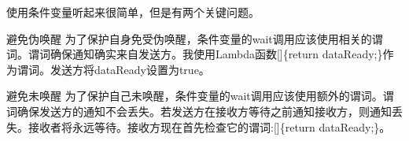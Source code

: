 
使用条件变量听起来很简单，但是有两个关键问题。

\begin{myWarning}{避免伪唤醒}
为了保护自身免受伪唤醒，条件变量的wait调用应该使用相关的谓词。谓词确保通知确实来自发送方。我使用Lambda函数[]\{return dataReady;\}作为谓词。发送方将dataReady设置为true。
\end{myWarning}

\begin{myWarning}{避免未唤醒}
为了保护自己未唤醒，条件变量的wait调用应该使用额外的谓词。谓词确保发送方的通知不会丢失。若发送方在接收方等待之前通知接收方，则通知丢失。接收者将永远等待。接收方现在首先检查它的谓词:[]\{return dataReady;\}。
\end{myWarning}
